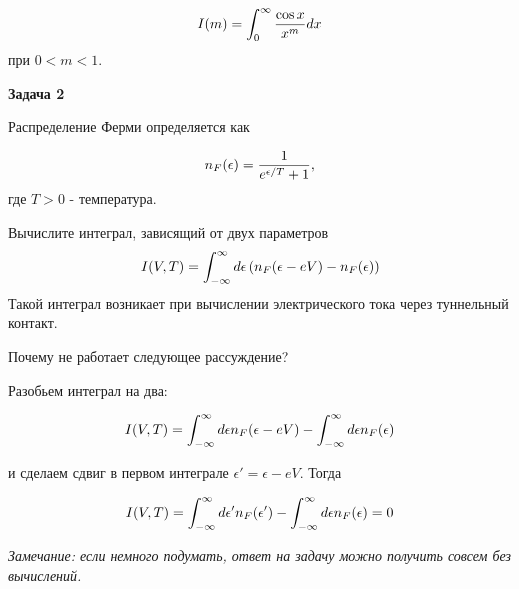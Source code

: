 \documentclass[a4paper,12pt]{article}
\begin{document}
\begin{equation}
I(m)	=\int_{0}^{\infty}\frac{\cos x}{x^{m}}dx \notag
\end{equation}
при $0<m<1$.

\vspace{15pt}
\noindent \textbf{Задача 2}

\noindent Распределение Ферми определяется как

\begin{equation}
n_{F}(\epsilon)	=\frac{1}{e^{\epsilon/T}+1},\notag
\end{equation}
где $T>0$ - температура.

\noindent Вычислите интеграл, зависящий от двух параметров
\begin{equation}
I(V,T)	=\int_{-\infty}^{\infty}d\epsilon\left(n_{F}(\epsilon-eV)-n_{F}(\epsilon)\right)\notag
\end{equation}
\noindent Такой интеграл возникает при вычислении электрического тока через туннельный контакт.

\noindent Почему не работает следующее рассуждение?

\noindent Разобьем интеграл на два:

\begin{equation}
I(V,T)	=\int_{-\infty}^{\infty}d\epsilon n_{F}(\epsilon-eV)-\int_{-\infty}^{\infty}d\epsilon n_{F}(\epsilon)\notag
\end{equation}

\noindent и сделаем сдвиг в первом интеграле $\epsilon'=\epsilon-eV$. Тогда

\begin{equation} 
I(V,T)	=\int_{-\infty}^{\infty}d\epsilon'n_{F}(\epsilon')-\int_{-\infty}^{\infty}d\epsilon n_{F}(\epsilon)=0 \notag
\end{equation}

\noindent \textit{Замечание: если немного подумать, ответ на задачу можно получить совсем без вычислений.}
\end{document}
